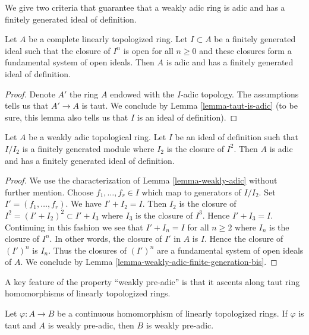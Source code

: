 \noindent
We give two criteria that guarantee that a weakly adic ring
is adic and has a finitely generated ideal of definition.

\begin{lemma}
\label{lemma-weakly-adic-finite-generation-bis}
Let $A$ be a complete linearly topologized ring. Let $I \subset A$ be a
finitely generated ideal such that the closure of $I^n$ is open for all
$n \geq 0$ and these closures form a fundamental system of open ideals.
Then $A$ is adic and has a finitely generated ideal of definition.
\end{lemma}

\begin{proof}
Denote $A'$ the ring $A$ endowed with the $I$-adic topology.
The assumptions tells us that $A' \to A$ is taut.
We conclude by Lemma \ref{lemma-taut-is-adic} (to be sure, this
lemma also tells us that $I$ is an ideal of definition).
\end{proof}

\begin{lemma}
\label{lemma-weakly-adic-finite-generation}
Let $A$ be a weakly adic topological ring. Let $I$ be an
ideal of definition such that $I/I_2$ is a finitely generated
module where $I_2$ is the closure of $I^2$.
Then $A$ is adic and has a finitely generated ideal of definition.
\end{lemma}

\begin{proof}
We use the characterization of Lemma \ref{lemma-weakly-adic}
without further mention.
Choose $f_1, \ldots, f_r \in I$ which map to generators of $I/I_2$.
Set $I' = (f_1, \ldots, f_r)$. We have $I' + I_2 = I$.
Then $I_2$ is the closure of $I^2 = (I' + I_2)^2 \subset I' + I_3$
where $I_3$ is the closure of $I^3$. Hence $I' + I_3 = I$.
Continuing in this fashion we see that $I' + I_n = I$ for all $n \geq 2$
where $I_n$ is the closure of $I^n$.
In other words, the closure of $I'$ in $A$ is $I$.
Hence the closure of $(I')^n$ is $I_n$. Thus the closures of $(I')^n$
are a fundamental system of open ideals of $A$.
We conclude by Lemma \ref{lemma-weakly-adic-finite-generation-bis}.
\end{proof}

\noindent
A key feature of the property ``weakly pre-adic'' is that it ascents
along taut ring homomorphisms of linearly topologized rings.

\begin{lemma}
\label{lemma-taut-ascent-weakly-adic}
Let $\varphi : A \to B$ be a continuous homomorphism of
linearly topologized rings. If $\varphi$ is taut and $A$
is weakly pre-adic, then $B$ is weakly pre-adic.
\end{lemma}

